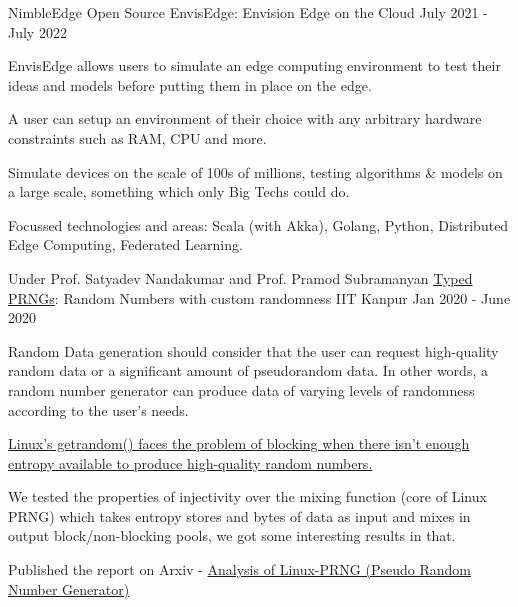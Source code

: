\begin{cventries}
  \cventry
    {NimbleEdge Open Source} %
    {EnvisEdge: Envision Edge on the Cloud} %
    {} %
    {July 2021 - July 2022} %
    {
      \begin{cvitems} %
      \item {EnvisEdge allows users to simulate an edge computing environment to test their ideas and models before putting them in place on the edge.}
      \item {A user can setup an environment of their choice with any arbitrary hardware constraints such as RAM, CPU and more.}
      \item {Simulate devices on the scale of 100s of millions, testing algorithms \& models on a large scale, something which only Big Techs could do.}
      \item {Focussed technologies and areas: Scala (with Akka), Golang, Python, Distributed Edge Computing, Federated Learning.}
      \end{cvitems}
    }



  \cventry
    {Under Prof. Satyadev Nandakumar and Prof. Pramod Subramanyan} %
    {\href{https://arxiv.org/abs/2312.03369}{Typed PRNGs}: Random Numbers with custom randomness} %
    {IIT Kanpur} %
    {Jan 2020 - June 2020} %
    {
      \begin{cvitems} %
      \item Random Data generation should consider that the user can request high-quality random data or a significant amount of pseudorandom data. In other words, a random number generator can produce data of varying levels of randomness according to the user's needs.
      \item \href{https://lwn.net/Articles/800509/}{Linux's getrandom() faces the problem of blocking when there isn't enough entropy available to produce high-quality random numbers.}
      \item We tested the properties of injectivity over the mixing function (core of Linux PRNG) which takes entropy stores and bytes of data as input and mixes in output block/non-blocking pools, we got some interesting results in that.
      \item Published the report on Arxiv - \href{https://arxiv.org/abs/2312.03369}{Analysis of Linux-PRNG (Pseudo Random Number Generator)}
      \end{cvitems}
    }


\end{cventries}
